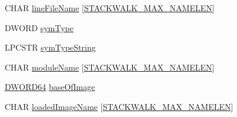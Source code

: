 \begin{DoxyCompactItemize}
C\-H\-A\-R \hyperlink{struct_stack_walker_1_1_callstack_entry_a5bda5c59f059dcfa090432b7e10fd1ee}{line\-File\-Name} \mbox{[}\hyperlink{class_stack_walker_a1744699928d413e6223b3c16df901ccfa9be56eae1b6e1edf9fbcd5df5e7dbb91}{S\-T\-A\-C\-K\-W\-A\-L\-K\-\_\-\-M\-A\-X\-\_\-\-N\-A\-M\-E\-L\-E\-N}\mbox{]}
\item 
D\-W\-O\-R\-D \hyperlink{struct_stack_walker_1_1_callstack_entry_a03429a9193b3fb335eba35dd94f50528}{sym\-Type}
\item 
L\-P\-C\-S\-T\-R \hyperlink{struct_stack_walker_1_1_callstack_entry_ab5e0a4df0bf80be98ddb879aa32729ef}{sym\-Type\-String}
\item 
C\-H\-A\-R \hyperlink{struct_stack_walker_1_1_callstack_entry_a79589ee14ad3c43520714d08b2b04dc1}{module\-Name} \mbox{[}\hyperlink{class_stack_walker_a1744699928d413e6223b3c16df901ccfa9be56eae1b6e1edf9fbcd5df5e7dbb91}{S\-T\-A\-C\-K\-W\-A\-L\-K\-\_\-\-M\-A\-X\-\_\-\-N\-A\-M\-E\-L\-E\-N}\mbox{]}
\item 
\hyperlink{_stack_walker_8h_a97fb241c597b99bcb965858f53cacac4}{D\-W\-O\-R\-D64} \hyperlink{struct_stack_walker_1_1_callstack_entry_a0f2f3cf18a7b0f185bacd2c98f954d77}{base\-Of\-Image}
\item 
C\-H\-A\-R \hyperlink{struct_stack_walker_1_1_callstack_entry_a599eaa04c323cacdb79c99601fd45eae}{loaded\-Image\-Name} \mbox{[}\hyperlink{class_stack_walker_a1744699928d413e6223b3c16df901ccfa9be56eae1b6e1edf9fbcd5df5e7dbb91}{S\-T\-A\-C\-K\-W\-A\-L\-K\-\_\-\-M\-A\-X\-\_\-\-N\-A\-M\-E\-L\-E\-N}\mbox{]}
\end{DoxyCompactItemize}


